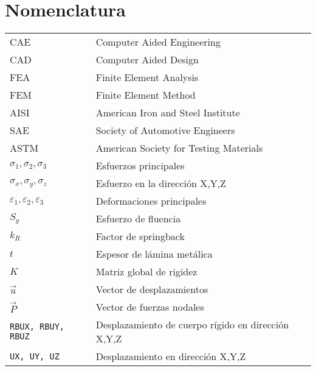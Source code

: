 \chapter*{Nomenclatura}




\begin{table}[h]
\def\arraystretch{1.15}
\begin{tabular}{p{4cm} p{12cm}}

CAE      &                       		      Computer Aided Engineering \\
CAD &                                  		  Computer Aided Design \\
FEA &                                  		  Finite Element Analysis \\
FEM & 							              Finite Element Method \\
AISI &                                        American Iron and Steel Institute \\
SAE &                                         Society of Automotive Engineers \\
ASTM &                                        American Society for Testing Materials \\
$\sigma_1, \sigma_2, \sigma_3$ &              Esfuerzos principales \\
$\sigma_x, \sigma_y, \sigma_z$ &			  Esfuerzo en la dirección X,Y,Z \\
$\varepsilon_1, \varepsilon_2, \varepsilon_3$ & Deformaciones principales \\
$ S_y $ &                                     Esfuerzo de fluencia \\
$ k_R $ &                                     Factor de springback \\
$ t $ &                                       Espesor de lámina metálica \\
$ K $ &                                       Matriz global de rigidez \\
$ \vec{u} $ &                                 Vector de desplazamientos \\
$ \vec{P} $ &                                 Vector de fuerzas nodales \\
{\tt RBUX, RBUY, RBUZ} &                      Desplazamiento de cuerpo rígido en dirección X,Y,Z \\
{\tt UX, UY, UZ} &                            Desplazamiento en dirección X,Y,Z \\



\end{tabular}
\end{table}